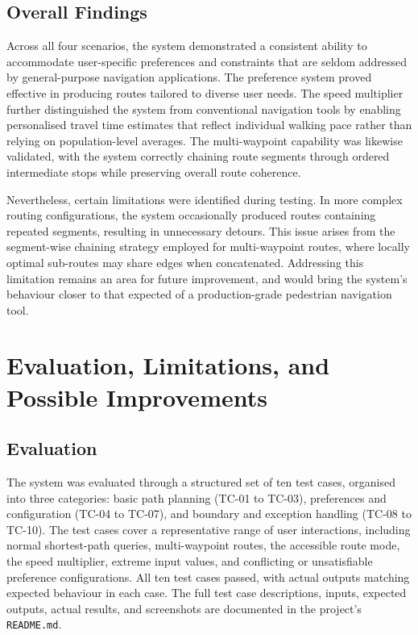 \documentclass[a4paper,10pt]{amsart}
\begin{document}
\subsection{Overall Findings}
Across all four scenarios, the system demonstrated a consistent ability to accommodate user-specific preferences and constraints that are seldom addressed by general-purpose navigation applications.
The preference system proved effective in producing routes tailored to diverse user needs.
The speed multiplier further distinguished the system from conventional navigation tools by enabling personalised travel time estimates that reflect individual walking pace rather than relying on population-level averages.
The multi-waypoint capability was likewise validated, with the system correctly chaining route segments through ordered intermediate stops while preserving overall route coherence.

Nevertheless, certain limitations were identified during testing.
In more complex routing configurations, the system occasionally produced routes containing repeated segments, resulting in unnecessary detours.
This issue arises from the segment-wise chaining strategy employed for multi-waypoint routes, where locally optimal sub-routes may share edges when concatenated.
Addressing this limitation remains an area for future improvement, and would bring the system's behaviour closer to that expected of a production-grade pedestrian navigation tool.

\section{Evaluation, Limitations, and Possible Improvements}

\subsection{Evaluation}

The system was evaluated through a structured set of ten test cases, organised into three categories: basic path planning (TC-01 to TC-03), preferences and configuration (TC-04 to TC-07), and boundary and exception handling (TC-08 to TC-10).
The test cases cover a representative range of user interactions, including normal shortest-path queries, multi-waypoint routes, the accessible route mode, the speed multiplier, extreme input values, and conflicting or unsatisfiable preference configurations.
All ten test cases passed, with actual outputs matching expected behaviour in each case.
The full test case descriptions, inputs, expected outputs, actual results, and screenshots are documented in the project's \texttt{README.md}.
\end{document}
